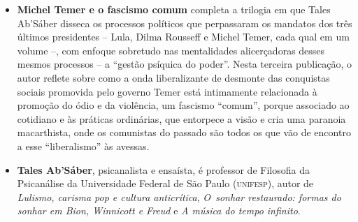\begin{itemize}


\item \textbf{Michel Temer e o fascismo comum} completa a trilogia em que Tales Ab'Sáber disseca
os processos políticos que perpassaram os mandatos dos três últimos presidentes -- Lula, Dilma
Rousseff e Michel Temer, cada qual em um volume --, com enfoque sobretudo nas mentalidades
alicerçadoras desses mesmos processos -- a ``gestão psíquica do poder''.
Nesta terceira publicação, o autor reflete sobre como a onda liberalizante de desmonte das
conquistas sociais promovida pelo governo Temer está
intimamente relacionada à promoção do ódio e da violência, um fascismo
``comum'', porque associado ao cotidiano e às práticas ordinárias, que entorpece a visão
e cria uma paranoia macarthista, onde os comunistas do passado são todos os que
vão de encontro a esse ``liberalismo'' às avessas.
  
\item \textbf{Tales Ab’Sáber}, psicanalista e ensaísta, é professor de Filosofia da Psicanálise da Universidade Federal 
de São Paulo (\textsc{unifesp}), autor de 
\emph{Lulismo, carisma pop e cultura anticrítica},
\textit{O~sonhar
restaurado: formas do sonhar em Bion, Winnicott e Freud} e
\textit{A música do tempo infinito}. 

\end{itemize}

